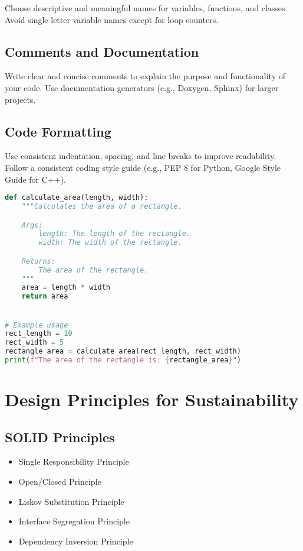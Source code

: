 \documentclass{book}
\begin{document}
Choose descriptive and meaningful names for variables, functions, and classes.  Avoid single-letter variable names except for loop counters.

\section{Comments and Documentation}

Write clear and concise comments to explain the purpose and functionality of your code.  Use documentation generators (e.g., Doxygen, Sphinx) for larger projects.

\section{Code Formatting}

Use consistent indentation, spacing, and line breaks to improve readability.  Follow a consistent coding style guide (e.g., PEP 8 for Python, Google Style Guide for C++).

\begin{lstlisting}[language=Python, caption=Example of well-formatted code, basicstyle=\footnotesize]
def calculate_area(length, width):
    """Calculates the area of a rectangle.

    Args:
        length: The length of the rectangle.
        width: The width of the rectangle.

    Returns:
        The area of the rectangle.
    """
    area = length * width
    return area


# Example usage
rect_length = 10
rect_width = 5
rectangle_area = calculate_area(rect_length, rect_width)
print(f"The area of the rectangle is: {rectangle_area}")
\end{lstlisting}

\chapter{Design Principles for Sustainability}

\section{SOLID Principles}
\begin{itemize}
    \item Single Responsibility Principle
    \item Open/Closed Principle
    \item Liskov Substitution Principle
    \item Interface Segregation Principle
    \item Dependency Inversion Principle
\end{itemize}
\end{document}
